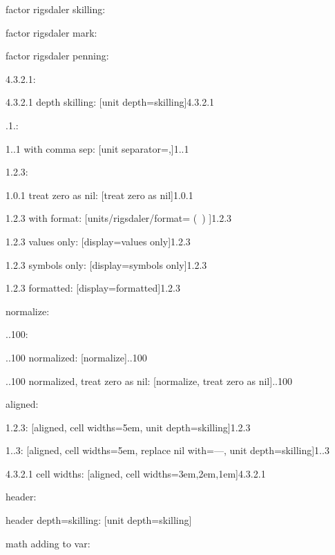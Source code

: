 \documentclass{article}
\begin{document}
factor rigsdaler skilling: \hfill {}

factor rigsdaler mark: \hfill {}

factor rigsdaler penning: \hfill {}

4.3.2.1: \hfill {}

4.3.2.1 depth skilling: \hfill {}[unit depth=skilling]{4.3.2.1}

.1.: \hfill {}

1..1 with comma sep: \hfill {}[unit separator={,}]{1..1}

1.2.3: \hfill {}

1.0.1 treat zero as nil: \hfill {}[treat zero as nil]{1.0.1}

1.2.3 with format: \hfill {}[units/rigsdaler/format={ (\SYMBOL\ \VALUE) }]{1.2.3}

1.2.3 values only: \hfill {}[display=values only]{1.2.3}

1.2.3 symbols only: \hfill {}[display=symbols only]{1.2.3}

1.2.3 formatted: \hfill {}[display=formatted]{1.2.3}

normalize:

..100: \hfill {}

..100 normalized: \hfill {}[normalize]{..100}

..100 normalized, treat zero as nil: \hfill {}[normalize, treat zero as nil]{..100}

aligned:

1.2.3: \hfill {}[aligned, cell widths=5em, unit depth=skilling]{1.2.3}

1..3: \hfill {}[aligned, cell widths=5em, replace nil with={---}, unit depth=skilling]{1..3}

4.3.2.1 cell widths: \hfill {}[aligned, cell widths={3em,2em,1em}]{4.3.2.1}

header: \hfill {}

header depth=skilling: \hfill {}[unit depth=skilling]

math adding to var:
\end{document}
